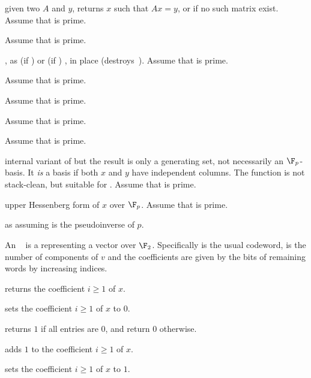 given two  $A$ and $y$, returns $x$ such that $Ax = y$, or 
if no such matrix exist. Assume that  is prime.

 Assume that  is prime.

, as  (if
) or  (if ) , in place
(destroys~). Assume that  is prime.

 Assume that  is prime.

 Assume that  is prime.

 Assume that  is prime.

 Assume that  is prime.

 internal variant of
 but the result is only a generating set, not
necessarily an $\F_p$-basis. It \emph{is} a basis if both $x$ and $y$
have independent columns. The function is not stack-clean, but
suitable for . Assume that  is prime.


 upper Hessenberg form of $x$ over $\F_p$.
Assume that  is prime.

 as 
assuming  is the pseudoinverse of $p$.

  An ~ is a
 representing a vector over $\F_2$. Specifically  is
the usual codeword,  is the number of components of $v$ and the
coefficients are given by the bits of remaining words by increasing indices.

 returns the coefficient $i\ge 1$ of $x$.

 sets the coefficient $i\ge 1$ of $x$ to
$0$.

 returns $1$ if all entries are $0$, and return
$0$ otherwise.

 adds $1$ to the coefficient $i\ge 1$ of $x$.

 sets the coefficient $i\ge 1$ of $x$ to $1$.

